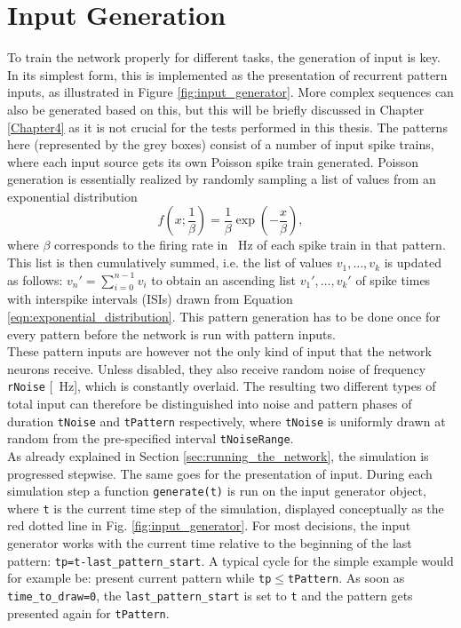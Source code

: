 \section{Input Generation} \label{sec:input_generation}
To train the network properly for different tasks, the generation of input is key. In its simplest form, this is implemented as the presentation of recurrent pattern inputs, as illustrated in Figure \ref{fig:input_generator}. More complex sequences can also be generated based on this, but this will be briefly discussed in Chapter \ref{Chapter4} as it is not crucial for the tests performed in this thesis. The patterns here (represented by the grey boxes) consist of a number of input spike trains, where each input source gets its own Poisson spike train generated. Poisson generation is essentially realized by randomly sampling a list of values from an exponential distribution
\begin{equation}
    f(x;\frac{1}{\beta})=\frac{1}{\beta}\exp{\left(-\frac{x}{\beta}\right)},
    \label{eqn:exponential_distribution}
\end{equation} 
where $\beta$ corresponds to the firing rate in \SI{}{\hertz} of each spike train in that pattern. This list is then cumulatively summed, i.e. the list of values $v_1, \dots, v_k$ is updated as follows: $v_n\prime=\sum_{i=0}^{n-1} v_i$ to obtain an ascending list $v_1\prime, \dots, v_k\prime$ of spike times with interspike intervals (ISIs) drawn from Equation \ref{eqn:exponential_distribution}. This pattern generation has to be done once for every pattern before the network is run with pattern inputs.\\
These pattern inputs are however not the only kind of input that the network neurons receive. Unless disabled, they also receive random noise of frequency \texttt{rNoise} [\SI{}{\hertz}], which is constantly overlaid. The resulting two different types of total input can therefore be distinguished into noise and pattern phases of duration \texttt{tNoise} and \texttt{tPattern} respectively, where \texttt{tNoise} is uniformly drawn at random from the pre-specified interval \texttt{tNoiseRange}.\\
As already explained in Section \ref{sec:running_the_network}, the simulation is progressed stepwise. The same goes for the presentation of input. During each simulation step a function \texttt{generate(t)} is run on the input generator object, where \texttt{t} is the current time step of the simulation, displayed conceptually as the red dotted line in Fig. \ref{fig:input_generator}. For most decisions, the input generator works with the current time relative to the beginning of the last pattern: \texttt{tp=t-last\_pattern\_start}. A typical cycle for the simple example would for example be: present current pattern while \texttt{tp}$\leq$\texttt{tPattern}. As soon as \texttt{time\_to\_draw=0}, the \texttt{last\_pat\-tern\_start} is set to \texttt{t} and the pattern gets presented again for \texttt{tPattern}.

